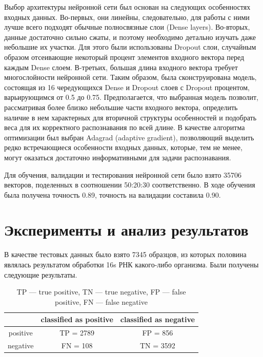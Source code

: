 \documentclass[14pt]{matmex-diploma}
\begin{document}
Выбор архитектуры нейронной сети был основан на следующих особенностях входных данных. Во-первых, они линейны, следовательно, для работы с ними лучше всего подходят обычные полносвязные слои (Dense layers). Во-вторых, данные достаточно сильно сжаты, и поэтому необходимо детально изучать даже небольшие их участки. Для этого были использованы Dropout слои, случайным образом отсеивающие некоторый процент элементов входного вектора перед каждым Dense слоем. В-третьих, большая длина входного вектора требует многослойности нейронной сети. Таким образом, была сконструирована модель, состоящая из 16 чередующихся Dense и Dropout слоев с Dropout процентом, варьирующимся от 0.5 до 0.75. Предполагается, что выбранная модель позволит, рассматривая более близко небольшие части входного вектора, определить наличие в нем характерных для вторичной структуры особенностей и подобрать веса для их корректного распознавания по всей длине. В качестве алгоритма оптимизации был выбран Adagrad (adaptive gradient), позволяющий выделить редко встречающиеся особенности входных данных, которые, тем не менее, могут оказаться достаточно информативными для задачи распознавания.

Для обучения, валидации и тестирования нейронной сети было взято 35706 векторов, поделенных в соотношении 50:20:30 соответственно. В ходе обучения была получена точность 0.89, точность на валидации составила 0.90.

\section{Эксперименты и анализ результатов}

В качестве тестовых данных было взято 7345 образцов, из которых половина являлась результатом обработки 16s РНК какого-либо организма. Были получены следующие результаты.
\begin{table}[h]
\begin{center}
  \begin{tabular}{ | c | c | c |}
    \hline
    & classified as positive & classified as negative \\
    \hline
    positive & TP = 2789 & FP = 856 \\
    \hline
    negative & FN = 108 & TN = 3592 \\
    \hline
  \end{tabular}
\end{center}
\caption{TP --- true positive, TN --- true negative, FP --- false positive, FN --- false negative }
\label{mistakes}
\end{table}
\end{document}
